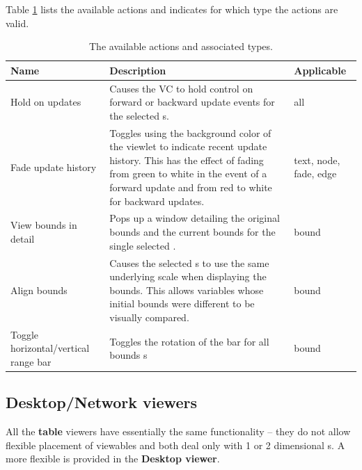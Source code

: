 Table \ref{tab:viewletactions} lists the available \viewlet{} actions
and indicates for which type the actions are valid.

\begin{table}[htsp]
\centering
\begin{tabular}{|l|p{7cm}|l|}
\hline
Name & Description & Applicable \\
\hline
\hline
Hold on updates & Causes the VC to hold control on forward or backward
update events for the selected \viewlet{}s. & all \\


\hline
Fade update history & Toggles using the background color of the
viewlet to indicate recent update history.  This has the effect of
fading from green to white in the event of a forward update and from
red to white for backward updates. & text, node, fade, edge \\

\hline
View bounds in detail & Pops up a window detailing the original bounds and the current bounds for the single selected \viewlet{}. & bound \\

\hline
Align bounds & Causes the selected \viewlet{}s to use the same underlying scale when displaying the bounds.  This allows variables whose initial bounds were different to be visually compared. & bound \\

\hline
Toggle horizontal/vertical range bar & Toggles the rotation of the bar for all bounds \viewlet{}s & bound \\
\hline
\end{tabular}
\caption{The available \viewlet{} actions and associated types.}
\label{tab:viewletactions}
\end{table}

\subsection{Desktop/Network viewers}

All the \textbf{table} viewers have essentially the same functionality
-- they do not allow flexible placement of viewables and both deal
only with 1 or 2 dimensional \viewable{}s.  A more flexible \viewer{}
is provided in the \textbf{Desktop viewer}.

